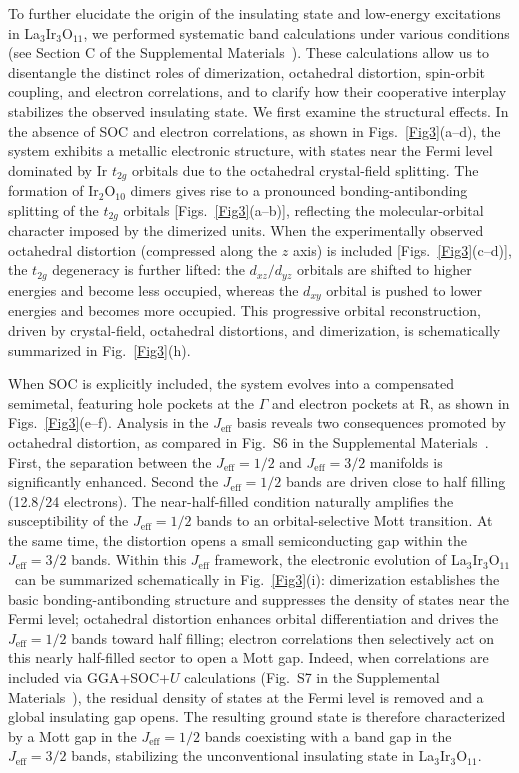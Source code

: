 \documentclass[prl,floatfix,twocolumn,superscriptaddress]{revtex4-2}
\newcommand{\LIO}{La$_3$Ir$_{3}$O$_{11}$}
\begin{document}
To further elucidate the origin of the insulating state and low-energy excitations in \LIO, we performed systematic band calculations under various conditions (see Section C of the Supplemental Materials~\footnotemark[1]). These calculations allow us to disentangle the distinct roles of dimerization, octahedral distortion, spin-orbit coupling, and electron correlations, and to clarify how their cooperative interplay stabilizes the observed insulating state. We first examine the structural effects. In the absence of SOC and electron correlations, as shown in Figs.~\ref{Fig3}(a--d), the system exhibits a metallic electronic structure, with states near the Fermi level dominated by Ir $t_{2g}$ orbitals due to the octahedral crystal-field splitting. The formation of Ir$_2$O$_{10}$ dimers gives rise to a pronounced bonding-antibonding splitting of the $t_{2g}$ orbitals [Figs.~\ref{Fig3}(a--b)], reflecting the molecular-orbital character imposed by the dimerized units. When the experimentally observed octahedral distortion (compressed along the $z$ axis) is included [Figs.~\ref{Fig3}(c--d)], the $t_{2g}$ degeneracy is further lifted: the $d_{xz}/d_{yz}$ orbitals are shifted to higher energies and become less occupied, whereas the $d_{xy}$ orbital is pushed to lower energies and becomes more occupied. This progressive orbital reconstruction, driven by crystal-field, octahedral distortions, and dimerization, is schematically summarized in Fig.~\ref{Fig3}(h).

When SOC is explicitly included, the system evolves into a compensated semimetal, featuring hole pockets at the $\Gamma$ and electron pockets at R, as shown in Figs.~\ref{Fig3}(e--f). Analysis in the $J_{\mathrm{eff}}$ basis reveals two consequences promoted by octahedral distortion, as compared in Fig.~S6 in the Supplemental Materials~\footnotemark[1]. First, the separation between the $J_{\mathrm{eff}} = 1/2$ and $J_{\mathrm{eff}} = 3/2$ manifolds is significantly enhanced. Second the $J_{\mathrm{eff}} = 1/2$ bands are driven close to half filling (12.8/24 electrons). The near-half-filled condition naturally amplifies the susceptibility of the $J_{\mathrm{eff}}=1/2$ bands to an orbital-selective Mott transition. At the same time, the distortion opens a small semiconducting gap within the $J_{\mathrm{eff}}=3/2$ bands. Within this $J_\mathrm{eff}$ framework, the electronic evolution of \LIO\ can be summarized schematically in Fig.~\ref{Fig3}(i): dimerization establishes the basic bonding-antibonding structure and suppresses the density of states near the Fermi level; octahedral distortion enhances orbital differentiation and drives the $J_{\mathrm{eff}} = 1/2$ bands toward half filling; electron correlations then selectively act on this nearly half-filled sector to open a Mott gap. Indeed, when correlations are included via GGA+SOC+$U$ calculations (Fig.~S7 in the Supplemental Materials~\footnotemark[1]), the residual density of states at the Fermi level is removed and a global insulating gap opens. The resulting ground state is therefore characterized by a Mott gap in the $J_{\mathrm{eff}}=1/2$ bands coexisting with a band gap in the $J_{\mathrm{eff}}=3/2$ bands, stabilizing the unconventional insulating state in \LIO.
\end{document}
